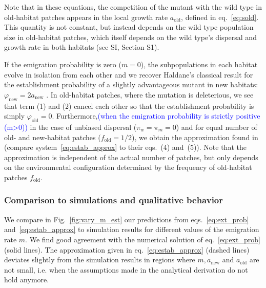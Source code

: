 \documentclass[11pt]{article}
\newcommand{\francois}[1]{\textcolor{blue}{(#1)}}
\newcommand{\chg}[1]{\textcolor{change}{#1}}
\begin{document}
Note that in these equations, the competition of the mutant with the wild type in old-habitat patches appears in the local growth rate $a_{\text{old}}$, defined in eq.~\eqref{eq:sold}. This quantity is not constant, but instead depends on the wild type population size in old-habitat patches, which itself depends on the wild type's dispersal and growth rate in both habitats \chg{(see SI, Section S1)}.

If the emigration probability is zero ($m=0$), the subpopulations in each habitat evolve in isolation from each other and we recover Haldane's classical result for the establishment probability of a slightly advantageous mutant in new habitats: $\varphi_{\text{new}}=2a_{\text{new}}$ \citep{haldane_1927}. \chg{In old-habitat patches, where the mutation is deleterious, we see that term (1) and (2) cancel each other so that the establishment probability is simply $\varphi_{\text{old}}=0$.} Furthermore,\francois{when the emigration probability is strictly positive (m>0)} in the case of \chg{unbiased} dispersal ($\pi_w=\pi_m=0$) and for equal number of old- and new-habitat patches ($f_{\text{old}}=1/2$), we obtain the approximation found in \cite{tomasini_2018} (compare system~\eqref{eq:estab_approx} to their eqs.~(4) and~(5)). Note that the approximation is independent of the actual number of patches, but only depends on the environmental configuration determined by the frequency of old-habitat patches $f_{\text{old}}$.

\subsubsection*{Comparison to simulations and qualitative behavior}
We compare in Fig.~\ref{fig:vary_m_est} our predictions from eqs.~\eqref{eq:ext_prob} and~\eqref{eq:estab_approx} to simulation results for different values of the emigration rate $m$. We find good agreement with the numerical solution of eq.~\eqref{eq:ext_prob} (solid lines). The approximation given in eq.~\eqref{eq:estab_approx} (dashed lines) deviates slightly from the simulation results in regions where $m,a_{\text{new}}$ and $a_{\text{old}}$ are not small, i.e. when the assumptions made in the analytical derivation do not hold anymore. 
\end{document}
